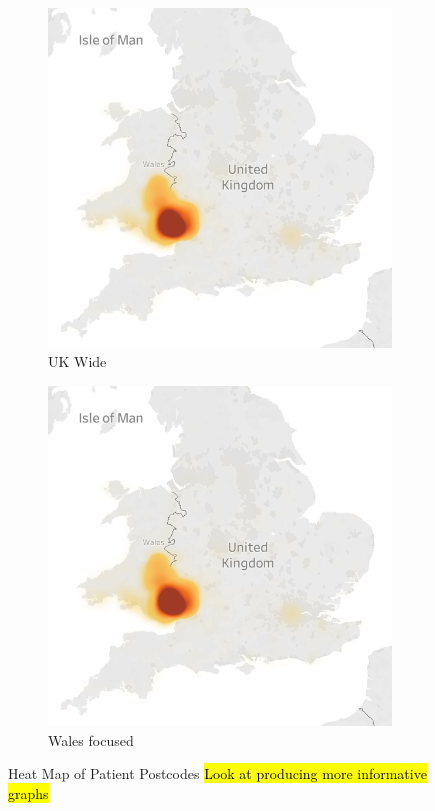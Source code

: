 \documentclass[../thesis.tex]{subfiles}
\begin{document}
\begin{figure}
\centering
\begin{subfigure}{.5\textwidth}
  \centering
  \includegraphics[scale=0.5]{Chapters/Chapter3/Figures/UK-tab.png}
  \caption{UK Wide}
  \label{Fig:Heatmap1}
\end{subfigure}%
\begin{subfigure}{.5\textwidth}
  \centering
  \includegraphics[scale=0.45]{Chapters/Chapter3/Figures/UK-tab.png}
  \caption{Wales focused}
  \label{Fig:Heatmap2}
\end{subfigure}
\caption{Heat Map of Patient Postcodes \hl{Look at producing more informative graphs}}
\label{Fig:Heatmap}
\end{figure}
\end{document}
